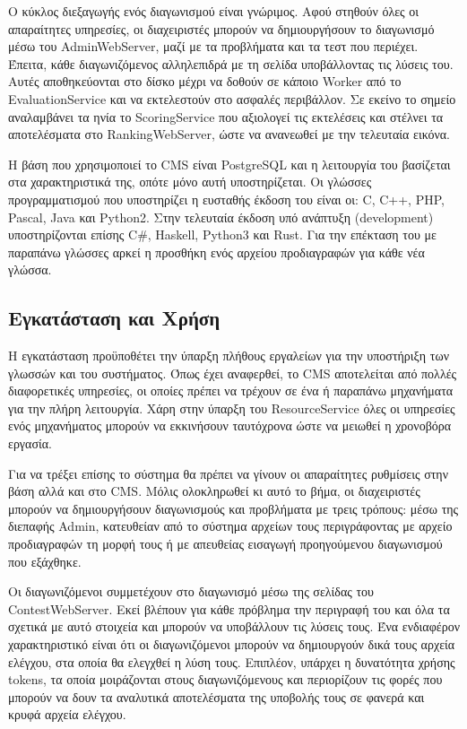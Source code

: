 \documentclass[diploma]{softlab-thesis}
\begin{document}
\bigskip

Ο κύκλος διεξαγωγής ενός διαγωνισμού είναι γνώριμος. Αφού στηθούν όλες οι
απαραίτητες υπηρεσίες, οι διαχειριστές μπορούν να δημιουργήσουν το διαγωνισμό
μέσω του AdminWebServer, μαζί με τα προβλήματα και τα τεστ που περιέχει.
Έπειτα, κάθε διαγωνιζόμενος αλληλεπιδρά με τη σελίδα υποβάλλοντας τις λύσεις
του. Αυτές αποθηκεύονται στο δίσκο μέχρι να δοθούν σε κάποιο Worker από το
EvaluationService και να εκτελεστούν στο ασφαλές περιβάλλον. Σε εκείνο το
σημείο αναλαμβάνει τα ηνία το ScoringService που αξιολογεί τις εκτελέσεις και
στέλνει τα αποτελέσματα στο RankingWebServer, ώστε να ανανεωθεί με την
τελευταία εικόνα.

\bigskip

Η βάση που χρησιμοποιεί το CMS είναι PostgreSQL και η λειτουργία του βασίζεται
στα χαρακτηριστικά της, οπότε μόνο αυτή υποστηρίζεται. Οι γλώσσες προγραμματισμού
που υποστηρίζει η ευσταθής έκδοση του είναι οι: C, C++, PHP, Pascal, Java και
Python2. Στην τελευταία έκδοση υπό ανάπτυξη (development) υποστηρίζονται επίσης
C\#, Haskell, Python3 και Rust. Για την επέκταση του με παραπάνω γλώσσες αρκεί
η προσθήκη ενός αρχείου προδιαγραφών για κάθε νέα γλώσσα.


\subsection{Εγκατάσταση και Χρήση}

Η εγκατάσταση προϋποθέτει την ύπαρξη πλήθους εργαλείων για την υποστήριξη των
γλωσσών και του συστήματος. Όπως έχει αναφερθεί, το CMS αποτελείται από πολλές
διαφορετικές υπηρεσίες, οι οποίες πρέπει να τρέχουν σε ένα ή παραπάνω μηχανήματα
για την πλήρη λειτουργία. Χάρη στην ύπαρξη του ResourceService όλες οι υπηρεσίες
ενός μηχανήματος μπορούν να εκκινήσουν ταυτόχρονα ώστε να μειωθεί η χρονοβόρα
εργασία.

\bigskip

Για να τρέξει επίσης το σύστημα θα πρέπει να γίνουν οι απαραίτητες ρυθμίσεις
στην βάση αλλά και στο CMS. Μόλις ολοκληρωθεί κι αυτό το βήμα, οι διαχειριστές
μπορούν να δημιουργήσουν διαγωνισμούς και προβλήματα με τρεις τρόπους: μέσω της
διεπαφής Admin, κατευθείαν από το σύστημα αρχείων τους περιγράφοντας με αρχείο
προδιαγραφών τη μορφή τους ή με απευθείας εισαγωγή προηγούμενου διαγωνισμού που
εξάχθηκε.

\bigskip

Οι διαγωνιζόμενοι συμμετέχουν στο διαγωνισμό μέσω της σελίδας του
ContestWebServer. Εκεί βλέπουν για κάθε πρόβλημα την περιγραφή του και όλα
τα σχετικά με αυτό στοιχεία και μπορούν να υποβάλλουν τις λύσεις τους. Ένα
ενδιαφέρον χαρακτηριστικό είναι ότι οι διαγωνιζόμενοι μπορούν να δημιουργούν
δικά τους αρχεία ελέγχου, στα οποία θα ελεγχθεί η λύση τους. Επιπλέον, υπάρχει
η δυνατότητα χρήσης tokens, τα οποία μοιράζονται στους διαγωνιζόμενους και
περιορίζουν τις φορές που μπορούν να δουν τα αναλυτικά αποτελέσματα της
υποβολής τους σε φανερά και κρυφά αρχεία ελέγχου.
\end{document}
